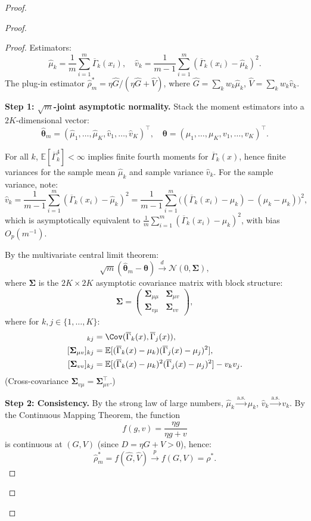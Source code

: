 \documentclass[12pt,a4paper]{article}
\newcommand{\E}{\mathbb{E}}
\begin{document}
\begin{proof}
\begin{proof}
\begin{proof}
Estimators:
\[
\hat\mu_k = \frac1m\sum_{i=1}^m \overline{\Gamma}_k(x_i),\quad
\hat v_k = \frac1{m-1}\sum_{i=1}^m (\overline{\Gamma}_k(x_i)-\hat\mu_k)^2.
\]
The plug-in estimator $\hat\rho^*_m = \eta\hat G / (\eta\hat G + \hat V)$,
where $\hat G = \sum_k w_k \hat\mu_k$, $\hat V = \sum_k w_k \hat v_k$.

\textbf{Step 1: $\sqrt{m}$-joint asymptotic normality.}
Stack the moment estimators into a $2K$-dimensional vector:
\[
\hat{\bm\theta}_m = (\hat\mu_1,\dots,\hat\mu_K,\hat v_1,\dots,\hat v_K)^\top,\quad
{\bm\theta} = (\mu_1,\dots,\mu_K,v_1,\dots,v_K)^\top.
\]

For all $k$, $\E[\overline{\Gamma}_k^4]<\infty$ implies finite fourth moments for $\overline{\Gamma}_k(x)$,
hence finite variances for the sample mean $\hat\mu_k$ and sample variance $\hat v_k$. For the sample variance, note:
\[
\hat v_k = \frac1{m-1}\sum_{i=1}^m (\overline{\Gamma}_k(x_i)-\hat\mu_k)^2
= \frac1{m-1}\sum_{i=1}^m \big((\overline{\Gamma}_k(x_i)-\mu_k) - (\hat\mu_k-\mu_k)\big)^2,
\]
which is asymptotically equivalent to $\frac1m\sum_{i=1}^m (\overline{\Gamma}_k(x_i)-\mu_k)^2$, with bias $O_p(m^{-1})$.

By the multivariate central limit theorem:
\[
\sqrt{m}(\hat{\bm\theta}_m - {\bm\theta}) \xrightarrow{d}
\mathcal{N}(0, \bm\Sigma),
\]
where $\bm\Sigma$ is the $2K\times 2K$ asymptotic covariance matrix with block structure:
\[
\bm\Sigma =
\begin{pmatrix}
\bm\Sigma_{\mu\mu} & \bm\Sigma_{\mu v} \\
\bm\Sigma_{v\mu} & \bm\Sigma_{vv}
\end{pmatrix},
\]
where for $k,j\in\{1,\dots,K\}$:
\begin{align*}
[\bm\Sigma_{\mu\mu}]_{kj} &= \Cov(\overline{\Gamma}_k(x), \overline{\Gamma}_j(x)),\\
[\bm\Sigma_{\mu v}]_{kj} &= \E[(\overline{\Gamma}_k(x)-\mu_k)(\overline{\Gamma}_j(x)-\mu_j)^2],\\
[\bm\Sigma_{vv}]_{kj} &= \E[(\overline{\Gamma}_k(x)-\mu_k)^2(\overline{\Gamma}_j(x)-\mu_j)^2] - v_k v_j.
\end{align*}
(Cross-covariance $\bm\Sigma_{v\mu} = \bm\Sigma_{\mu v}^\top$.)

\textbf{Step 2: Consistency.}
By the strong law of large numbers, $\hat\mu_k \xrightarrow{\text{a.s.}} \mu_k$, $\hat v_k \xrightarrow{\text{a.s.}} v_k$.
By the Continuous Mapping Theorem, the function
\[
f(g,v) = \frac{\eta g}{\eta g + v}
\]
is continuous at $(G,V)$ (since $D = \eta G + V > 0$), hence:
\[
\hat\rho^*_m = f(\hat G, \hat V) \xrightarrow{p} f(G, V) = \rho^*.
\]


\end{proof}
\end{proof}
\end{proof}
\end{document}
